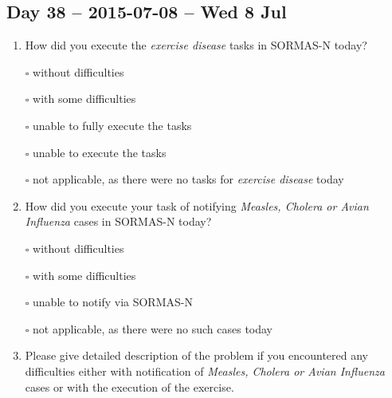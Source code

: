 \documentclass[a4paper, titlepage]{tufte-handout}
\begin{document}
\subsection{Day 38 -- 2015-07-08 -- Wed  8 Jul}
\label{sec-8-28}
\begin{enumerate}
\item How did you execute the \emph{exercise disease} tasks in SORMAS-N today?

\quad $\square$ without difficulties

\quad $\square$ with some difficulties

\quad $\square$ unable to fully execute the tasks

\quad $\square$ unable to execute the tasks

\quad $\square$ not applicable, as there were no tasks for \emph{exercise disease} today

\item How did you execute your task of notifying \emph{Measles, Cholera or Avian Influenza} cases in SORMAS-N today?

\quad $\square$ without difficulties

\quad $\square$ with some difficulties

\quad $\square$ unable to notify via SORMAS-N

\quad $\square$ not applicable, as there were no such cases today

\item Please give detailed description of the problem if you encountered any difficulties either with notification of \emph{Measles, Cholera or Avian Influenza} cases or with the execution of the exercise.

\hrulefill

\hrulefill

\hrulefill

\hrulefill

\hrulefill

\hrulefill

\hrulefill

\hrulefill

\hrulefill

\hrulefill
\end{enumerate}

\newpage
\end{document}

